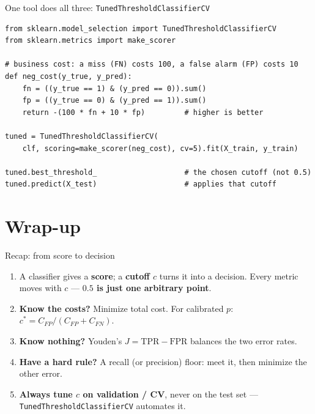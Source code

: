 \documentclass[aspectratio=169]{beamer}
\begin{document}
\begin{frame}[fragile]{One tool does all three: \texttt{TunedThresholdClassifierCV}}
\begin{lstlisting}[basicstyle=\ttfamily\scriptsize]
from sklearn.model_selection import TunedThresholdClassifierCV
from sklearn.metrics import make_scorer

# business cost: a miss (FN) costs 100, a false alarm (FP) costs 10
def neg_cost(y_true, y_pred):
    fn = ((y_true == 1) & (y_pred == 0)).sum()
    fp = ((y_true == 0) & (y_pred == 1)).sum()
    return -(100 * fn + 10 * fp)         # higher is better

tuned = TunedThresholdClassifierCV(
    clf, scoring=make_scorer(neg_cost), cv=5).fit(X_train, y_train)

tuned.best_threshold_                    # the chosen cutoff (not 0.5)
tuned.predict(X_test)                    # applies that cutoff
\end{lstlisting}
  \vskip 2pt
\end{frame}

\section{Wrap-up}

\begin{frame}{Recap: from score to decision}
  \begin{enumerate}\small
    \item A classifier gives a \textbf{score}; a \textbf{cutoff $c$} turns it into a decision.
      Every metric moves with $c$ --- \textbf{$0.5$ is just one arbitrary point}.
    \item \textbf{Know the costs?} Minimize total cost. For calibrated $p$:
      $c^* = C_{FP}/(C_{FP}+C_{FN})$.
    \item \textbf{Know nothing?} Youden's $J = \mathrm{TPR}-\mathrm{FPR}$ balances the two error rates.
    \item \textbf{Have a hard rule?} A recall (or precision) floor: meet it, then minimize the other error.
    \item \textbf{Always tune $c$ on validation / CV}, never on the test set ---
      \texttt{TunedThresholdClassifierCV} automates it.
  \end{enumerate}
  \vfill
\end{frame}
\end{document}
